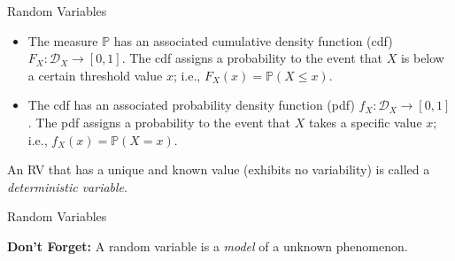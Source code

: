 \documentclass[9pt]{beamer}
\begin{document}
\begin{frame}{Random Variables}
\begin{block}{}
\begin{itemize}
\item The measure $\mathbb{P}$ has an associated cumulative density function (cdf) $F_X:\mathcal{D}_X\to [0,1]$. The cdf assigns a probability to the event that $X$ is below a certain threshold value $x$; i.e., $F_X(x)=\mathbb{P}(X\leq x)$.
\item The cdf has an associated probability density function (pdf) $f_X:\mathcal{D}_X\to [0,1]$. The pdf assigns a probability to the event that $X$ takes a specific value $x$; i.e., $f_X(x)=\mathbb{P}(X=x)$.  
\end{itemize}
\end{block}
An RV that has a unique and known value (exhibits no variability) is called a {\em deterministic variable}. 
\end{frame}


\begin{frame}{Random Variables}
\begin{block}{}
{\bf Don't Forget:} A random variable is a {\em model} of a unknown phenomenon. 
\end{block}
\end{frame}
\end{document}
